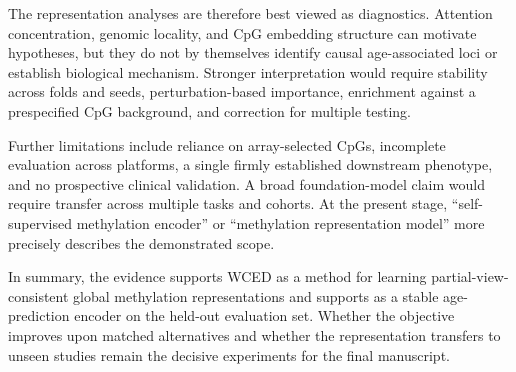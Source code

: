 The representation analyses are therefore best viewed as diagnostics. Attention concentration,
genomic locality, and CpG embedding structure can motivate hypotheses, but they do not by
themselves identify causal age-associated loci or establish biological mechanism. Stronger
interpretation would require stability across folds and seeds, perturbation-based importance,
enrichment against a prespecified CpG background, and correction for multiple testing.

Further limitations include reliance on array-selected CpGs, incomplete evaluation across
platforms, a single firmly established downstream phenotype, and no prospective clinical
validation. A broad foundation-model claim would require transfer across multiple tasks and
cohorts. At the present stage, ``self-supervised methylation encoder'' or ``methylation
representation model'' more precisely describes the demonstrated scope.

In summary, the evidence supports WCED as a method for learning partial-view-consistent global
methylation representations and supports \method{} as a stable age-prediction encoder on the
held-out evaluation set. Whether the objective improves upon matched alternatives and whether
the representation transfers to unseen studies remain the decisive experiments for the final
manuscript.

